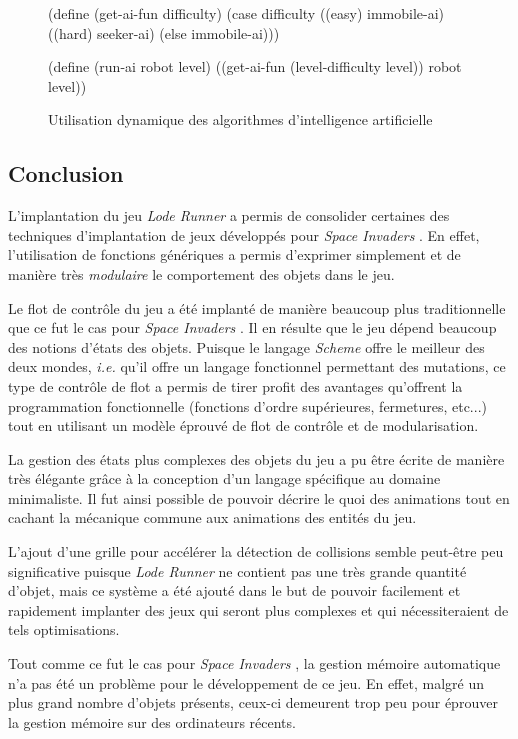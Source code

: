 \documentclass[12pt,twoside,letterpaper,francais]{book}
\newcommand{\ie}{{\textit{i.e. }}}
\newcommand{\lr}{{\textit{Lode Runner }}}
\newcommand{\si}{{\textit{Space Invaders }}}
\newcommand{\Schemelang}{{\textit{Scheme }}}
\begin{document}
\begin{figure}[htb!]
  \begin{schemecode}
(define (get-ai-fun difficulty)
  (case difficulty
    ((easy) immobile-ai)
    ((hard) seeker-ai)
    (else immobile-ai)))

(define (run-ai robot level)
  ((get-ai-fun (level-difficulty level)) robot level))
  \end{schemecode}
  \caption{Utilisation dynamique des algorithmes d'intelligence
    artificielle}
  \label{Exp:dyn-ai}
\end{figure}


\FloatBarrier
\subsection{Conclusion}
L'implantation du jeu \lr a permis de consolider certaines des
techniques d'implantation de jeux développés pour \si. En effet,
l'utilisation de fonctions génériques a permis d'exprimer simplement
et de manière très \emph{modulaire} le comportement des objets dans le
jeu.

Le flot de contrôle du jeu a été implanté de manière beaucoup plus
traditionnelle que ce fut le cas pour \si. Il en résulte que le jeu
dépend beaucoup des notions d'états des objets. Puisque le langage
\Schemelang offre le meilleur des deux mondes, \ie qu'il offre un langage
fonctionnel permettant des mutations, ce type de contrôle de flot a
permis de tirer profit des avantages qu'offrent la programmation
fonctionnelle (fonctions d'ordre supérieures, fermetures, etc...) tout
en utilisant un modèle éprouvé de flot de contrôle et de
modularisation.

La gestion des états plus complexes des objets du jeu a pu être écrite
de manière très élégante grâce à la conception d'un langage spécifique
au domaine minimaliste. Il fut ainsi possible de pouvoir décrire le
\og quoi \fg des animations tout en cachant la mécanique commune aux
animations des entités du jeu.

L'ajout d'une grille pour accélérer la détection de collisions semble
peut-être peu significative puisque \lr ne contient pas une très
grande quantité d'objet, mais ce système a été ajouté dans le but de
pouvoir facilement et rapidement implanter des jeux qui seront plus
complexes et qui nécessiteraient de tels optimisations.

Tout comme ce fut le cas pour \si, la gestion mémoire automatique n'a
pas été un problème pour le développement de ce jeu. En effet, malgré
un plus grand nombre d'objets présents, ceux-ci demeurent trop peu
pour éprouver la gestion mémoire sur des ordinateurs récents.
\end{document}
